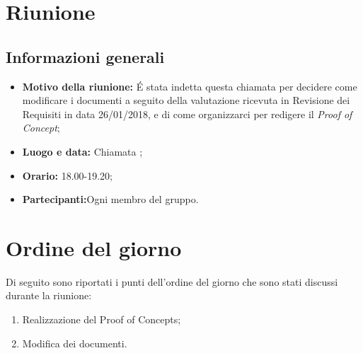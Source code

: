 \documentclass[VER-2018-05-02.tex]{subfiles}
\begin{document}
\chapter{Riunione}
\section{Informazioni generali}
\begin{itemize}
	\item \textbf{Motivo della riunione:} \'{E} stata indetta questa chiamata  per decidere come modificare i documenti a seguito della valutazione ricevuta in Revisione dei Requisiti in data 26/01/2018, e di come organizzarci per redigere il \textit{Proof of Concept};
	\item \textbf{Luogo e data:} Chiamata ;
	\item \textbf{Orario:} 18.00-19.20;
	\item \textbf{Partecipanti:}Ogni membro del gruppo.
\end{itemize}

\chapter{Ordine del giorno}
Di seguito sono riportati i punti dell'ordine del giorno che sono stati discussi durante la riunione:
\begin{enumerate}
	\item Realizzazione del Proof of Concepts;
	\item Modifica dei documenti.
\end{enumerate}
\end{document}
